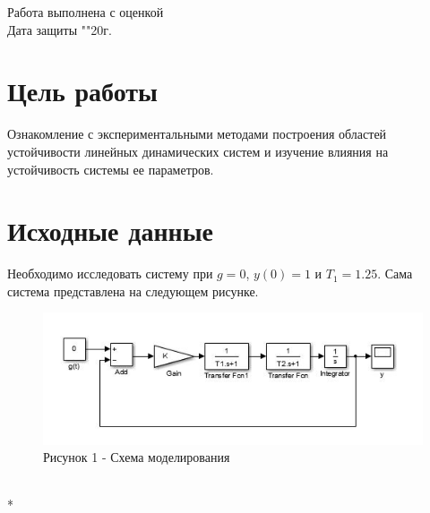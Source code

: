 \documentclass[a4paper, 12pt]{article}
\begin{document}
\begin{titlepage}
	Работа выполнена с оценкой \hspace{1cm} \underline{\hspace{8cm}} \\ 
	\vspace{1cm}
	Дата защиты "\underline{\hspace{0.7cm}}"\hspace{0.2cm}\underline{\hspace{2cm}}\hspace{0.2cm}20\underline{\hspace{0.7cm}}г.
	
\end{titlepage}	


\section*{\centering Цель работы}\hfill\par
Ознакомление с экспериментальными методами построения областей устойчивости линейных динамических систем и изучение влияния на устойчивость системы ее параметров.

\section*{\centering Исходные данные}\hfill\par Необходимо исследовать систему при $g = 0$, $y(0) = 1$ и $T_1 = 1.25$. Сама система представлена на следующем рисунке.
\begin{figure}[h]
    \centering
    \includegraphics[width = 0.8\linewidth]{sxema} \\
   \centering Рисунок 1 - Схема моделирования
\end{figure}
\hfill\\*
\newpage
\end{document}
